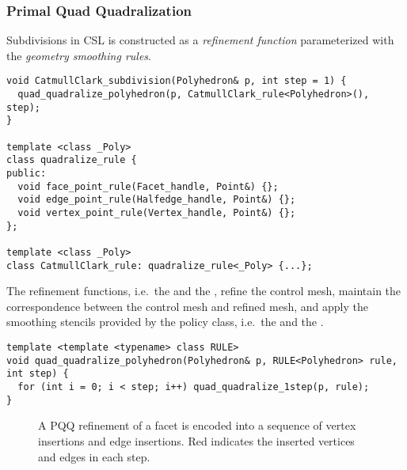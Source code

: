 


\subsubsection{Primal Quad Quadralization}
Subdivisions in CSL is constructed as a
\emph{refinement function} parameterized with the 
\emph{geometry smoothing rules}. 

\begin{lstlisting}
void CatmullClark_subdivision(Polyhedron& p, int step = 1) {
  quad_quadralize_polyhedron(p, CatmullClark_rule<Polyhedron>(), step);
}

template <class _Poly>
class quadralize_rule {
public:
  void face_point_rule(Facet_handle, Point&) {};
  void edge_point_rule(Halfedge_handle, Point&) {};
  void vertex_point_rule(Vertex_handle, Point&) {};
};

template <class _Poly>
class CatmullClark_rule: quadralize_rule<_Poly> {...};
\end{lstlisting}

The refinement functions, i.e.\ the  
and the , 
refine the control mesh, maintain the correspondence between the 
control mesh and refined mesh, and apply the smoothing stencils 
provided by the policy class, i.e.\ the  
and the . 

\begin{lstlisting}
template <template <typename> class RULE>
void quad_quadralize_polyhedron(Polyhedron& p, RULE<Polyhedron> rule, int step) {
  for (int i = 0; i < step; i++) quad_quadralize_1step(p, rule);
}
\end{lstlisting}

\begin{figure}
  \centering
  \caption{A PQQ refinement of a facet is encoded into a sequence of
  vertex insertions and edge insertions. Red indicates the inserted
  vertices and edges in each step.}
  \label{fig:CCRefinement}
\end{figure}

